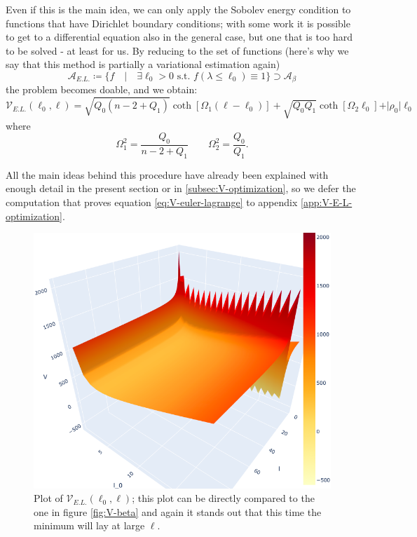 Even if this is the main idea, we can only apply the Sobolev energy condition to functions that have Dirichlet boundary conditions; with some work it is possible to get to a differential equation also in the general case, but one that is too hard to be solved - at least for us.
By reducing to the set of functions (here's why we say that this method is partially a variational estimation again)
\[
\mathcal{A}_{E.L.} \coloneqq \{f \quad \vert \quad \exists \ell_0 > 0 \text{ s.t. } f(\lambda \le \ell_0) \equiv 1\} \supset \mathcal{A}_{\beta}
\]
the problem becomes doable, and we obtain:
\begin{equation}
	\label{eq:V-euler-lagrange}
	\mathcal{V}_{E.L.}(\ell_0, \ell) = \sqrt{Q_0(n - 2 + Q_1)}\coth\left[\Omega_1(\ell- \ell_0)\right] + \sqrt{Q_0Q_1}\coth\left[\Omega_2\ell_0\right] + \vert \rho_0\vert\ell_0
\end{equation}
where
\[
\Omega_1^2 = \frac{Q_0}{n - 2 + Q_1} \quad \quad  \Omega_2^2 = \frac{Q_0}{Q_1}.
\]

All the main ideas behind this procedure have already been explained with enough detail in the present section or in \ref{subsec:V-optimization}, so we defer the computation that proves equation \eqref{eq:V-euler-lagrange} to appendix \ref{app:V-E-L-optimization}.

\begin{figure}
	\includegraphics[scale=0.3]{Immagini/V-E-L.png}
	\caption[]{Plot of \(\mathcal{V}_{E.L.}(\ell_0, \ell)\); this plot can be directly compared to the one in figure \ref{fig:V-beta} and again it stands out that this time the minimum will lay at large \(\ell\).}
	\label{fig:V-E-L}
\end{figure}

